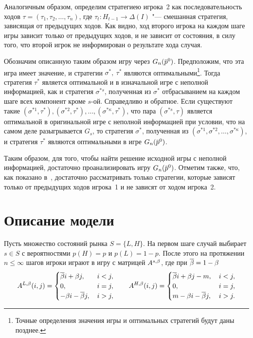 Аналогичным образом, определим стратегиею игрока~2 как последовательность
ходов %
$\tau = (\tau_1, \tau_2, \ldots, \tau_n)$, где %
$\tau_t: H_{t-1} \rightarrow \Delta(I)$ "--- смешанная стратегия, зависящая от
предыдущих ходов. Как видно, ход второго игрока на каждом шаге игры зависит
только от предыдущих ходов, и не зависит от состояния, в силу того, что второй
игрок не информирован о результате хода случая.

Обозначим описанную таким образом игру через $G_n(\po)$. Предположим, что эта
игра имеет значение, и стратегии $\sigma^*,\ \tau^*$ являются
оптимальными\footnote{Точные определения значения игры и оптимальных стратегий
  будут даны позднее.}. Тогда стратегия $\tau^*$ является оптимальной и в
изначальной игре с неполной информацией, как и стратегия $\sigma^{*s}$,
полученная из $\sigma^*$ отбрасыванием на каждом шаге всех компонент кроме
$s$-ой. Справедливо и обратное. Если существуют такие %
$(\sigma^{*1}, \tau^*), (\sigma^{*2}, \tau^*), \ldots, (\sigma^{*\kappa},
\tau^*)$, %
что пара $(\sigma^{*s}, \tau)$ является оптимальной в оригинальной игре с
неполной информацией при условии, что на самом деле разыгрывается $G_s$, то
стратегия $\sigma^*$, полученная из %
$(\sigma^{*1}, \sigma^{*2}, \ldots, \sigma^{*\kappa})$, и стратегия $\tau^*$
являются оптимальными в игре $G_n(\po)$.

Таким образом, для того, чтобы найти решение исходной игры с неполной
информацией, достаточно проанализировать игру $G_n(\po)$. Отметим также, что,
как показано в~\cite{aumann95}, достаточно рассматривать только стратегии,
которые зависят только от предыдущих ходов игрока~1 и не зависят от ходом
игрока~2.


\section{Описание модели}\label{ch1:model}
Пусть множество состояний рынка $S = \{L, H\}$. На первом шаге случай выбирает
$s \in S $ с вероятностями $p(H) = p$ и $p(L) = 1 - p$. После этого на
протяжении $n \leq \infty$ шагов игроки играют в игру с матрицей $A^{s,\beta}$,
где при $\overline{\beta} = 1-\beta$
\begin{equation*}
  A^{L,\beta}(i, j) = \begin{cases}
    \overline{\beta} i + \beta j, &\, i < j, \\
    0, &\, i = j, \\
    -\beta i - \overline{\beta} j, &\, i > j,
  \end{cases}
  \qquad
  A^{H,\beta}(i, j) = \begin{cases}
    \overline{\beta} i + \beta j - m, &\, i < j, \\
    0, &\, i = j, \\
    m - \beta i - \overline{\beta} j, &\, i > j.
  \end{cases}
\end{equation*}

